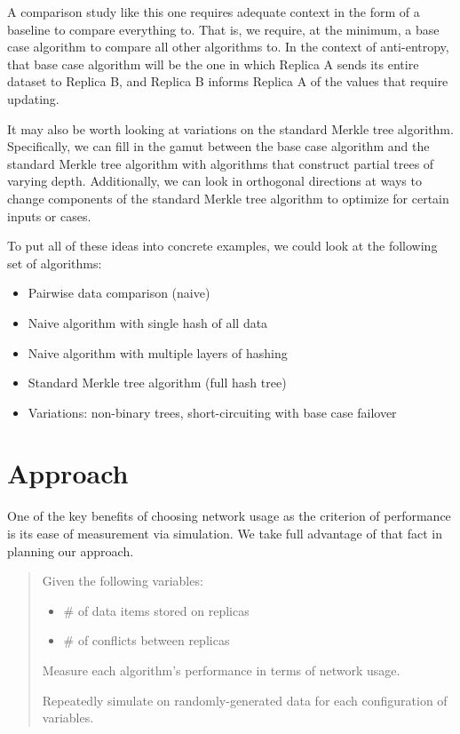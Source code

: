 \documentclass[11pt,letterpaper]{article}
\begin{document}
A comparison study like this one requires adequate context in the form of a baseline to compare everything to. That is, we require, at the minimum, a base case algorithm to compare all other algorithms to. In the context of anti-entropy, that base case algorithm will be the one in which Replica A sends its entire dataset to Replica B, and Replica B informs Replica A of the values that require updating.

It may also be worth looking at variations on the standard Merkle tree algorithm. Specifically, we can fill in the gamut between the base case algorithm and the standard Merkle tree algorithm with algorithms that construct partial trees of varying depth. Additionally, we can look in orthogonal directions at ways to change components of the standard Merkle tree algorithm to optimize for certain inputs or cases.

To put all of these ideas into concrete examples, we could look at the following set of algorithms:

\begin{itemize}
\item Pairwise data comparison (naive)
\item Naive algorithm with single hash of all data
\item Naive algorithm with multiple layers of hashing
\item Standard Merkle tree algorithm (full hash tree)
\item Variations: non-binary trees, short-circuiting with base case failover
\end{itemize}

\section{Approach}
One of the key benefits of choosing network usage as the criterion of performance is its ease of measurement via simulation. We take full advantage of that fact in planning our approach.

\begin{quote}
Given the following variables:
\begin{itemize}
\item \# of data items stored on replicas
\item \# of conflicts between replicas
\end{itemize}
Measure each algorithm's performance in terms of network usage.

Repeatedly simulate on randomly-generated data for each configuration of variables.
\end{quote}
\end{document}
